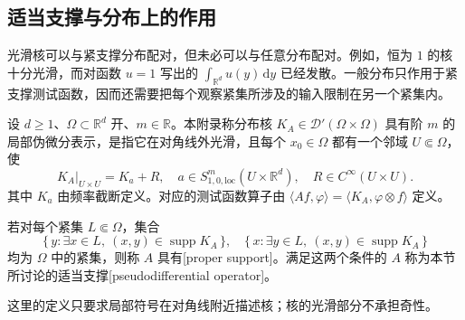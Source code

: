 \subsection{适当支撑与分布上的作用}
\label{b2:subsec:G0202}

光滑核可以与紧支撑分布配对，但未必可以与任意分布配对。例如，恒为 \(1\) 的核十分光滑，而对函数 \(u=1\) 写出的 \(\int_{\mathbb R^d}u(y)\,\mathrm dy\) 已经发散。一般分布只作用于紧支撑测试函数，因而还需要把每个观察紧集所涉及的输入限制在另一个紧集内。

\begin{definition}[局部符号表示与适当支撑]
\label{b2:def:G-proper-support}
设 \(d\ge1\)、\(\Omega\subset\mathbb R^d\) 开、\(m\in\mathbb R\)。本附录称分布核 \(K_A\in\mathcal D'(\Omega\times\Omega)\) 具有阶 \(m\) 的局部伪微分表示，是指它在对角线外光滑，且每个 \(x_0\in\Omega\) 都有一个邻域 \(U\Subset\Omega\)，使
\[
 K_A|_{U\times U}=K_a+R,
 \quad a\in S^m_{1,0,\mathrm{loc}}(U\times\mathbb R^d),
 \quad R\in C^\infty(U\times U).
\]
其中 \(K_a\) 由频率截断定义。对应的测试函数算子由
\(\langle Af,\varphi\rangle=\langle K_A,\varphi\otimes f\rangle\)
定义。

\ProseParagraphBreak
若对每个紧集 \(L\Subset\Omega\)，集合
\[
 \{\,y:\exists x\in L,\ (x,y)\in\operatorname{supp}K_A\,\},
 \quad
 \{\,x:\exists y\in L,\ (x,y)\in\operatorname{supp}K_A\,\}
\]
均为 \(\Omega\) 中的紧集，则称 \(A\) 具有[proper support]。满足这两个条件的 \(A\) 称为本节所讨论的适当支撑[pseudodifferential operator]。
\end{definition}
这里的定义只要求局部符号在对角线附近描述核；核的光滑部分不承担奇性。

